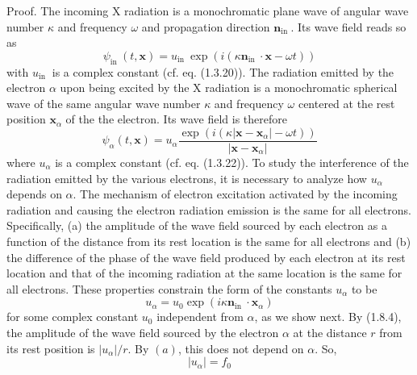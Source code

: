 \documentclass{article}
\begin{document}
Proof. The incoming X radiation is a monochromatic plane wave of angular wave number $\kappa$ and frequency $\omega$ and propagation direction $\boldsymbol{n}_{\text {in }}$. Its wave field reads so as
$$
\begin{equation*}
\psi_{\text {in }}(t, \boldsymbol{x})=u_{\text {in }} \exp \left(i\left(\kappa \boldsymbol{n}_{\text {in }} \cdot \boldsymbol{x}-\omega t\right)\right) \tag{1.8.3}
\end{equation*}
$$
with $u_{\text {in }}$ is a complex constant (cf. eq. (1.3.20)). The radiation emitted by the electron $\alpha$ upon being excited by the X radiation is a monochromatic spherical wave of the same angular wave number $\kappa$ and frequency $\omega$ centered at the rest position $\boldsymbol{x}_{\alpha}$ of the the electron. Its wave field is therefore
$$
\begin{equation*}
\psi_{\alpha}(t, \boldsymbol{x})=u_{\alpha} \frac{\exp \left(i\left(\kappa\left|\boldsymbol{x}-\boldsymbol{x}_{\alpha}\right|-\omega t\right)\right)}{\left|\boldsymbol{x}-\boldsymbol{x}_{\alpha}\right|} \tag{1.8.4}
\end{equation*}
$$
where $u_{\alpha}$ is a complex constant (cf. eq. (1.3.22)). To study the interference of the radiation emitted by the various electrons, it is necessary to analyze how $u_{\alpha}$ depends on $\alpha$. The mechanism of electron excitation activated by the incoming radiation and causing the electron radiation emission is the same for all electrons. Specifically, (a) the amplitude of the wave field sourced by each electron as a function of the distance
from its rest location is the same for all electrons and (b) the difference of the phase of the wave field produced by each electron at its rest location and that of the incoming radiation at the same location is the same for all electrons. These properties constrain the form of the constants $u_{\alpha}$ to be
$$
\begin{equation*}
u_{\alpha}=u_{0} \exp \left(i \kappa \boldsymbol{n}_{\text {in }} \cdot \boldsymbol{x}_{\alpha}\right) \tag{1.8.5}
\end{equation*}
$$
for some complex constant $u_{0}$ independent from $\alpha$, as we show next.
By (1.8.4), the amplitude of the wave field sourced by the electron $\alpha$ at the distance $r$ from its rest position is $\left|u_{\alpha}\right| / r$. By $(a)$, this does not depend on $\alpha$. So,
$$
\begin{equation*}
\left|u_{\alpha}\right|=f_{0} \tag{1.8.6}
\end{equation*}
$$
\end{document}
